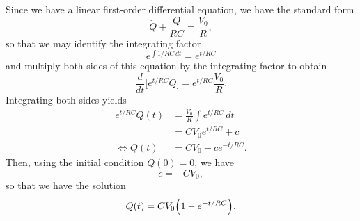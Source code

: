 Since we have a linear first-order differential equation, we have the
standard form
\[
  \dot{Q} + \frac{Q}{RC} = \frac{V_0}{R},
\]
so that we may identify the integrating factor
\[
  e^{\int{1/RC\, dt}} = e^{t/RC}
\]
and multiply both sides of this equation by the integrating factor to obtain
\[
  \frac{d}{dt}\bigl[e^{t/RC} Q\bigr] = e^{t/RC} \frac{V_0}{R}.
\]
Integrating both sides yields
\begin{equation*}
  \begin{split}
    e^{t/RC} Q(t) &= \frac{V_0}{R}\int{e^{t/RC} \, dt} \\
    &= CV_0 e^{t/RC} + c \\
    \Leftrightarrow Q(t) &= CV_0 + ce^{-t/RC}.
  \end{split}
\end{equation*}
Then, using the initial condition $Q(0) = 0$, we have
\[
  c = -CV_0,
\]
so that we have the solution
\[
  Q(t) = CV_0\Bigl(1 - e^{-t/RC}\Bigr).
\]
